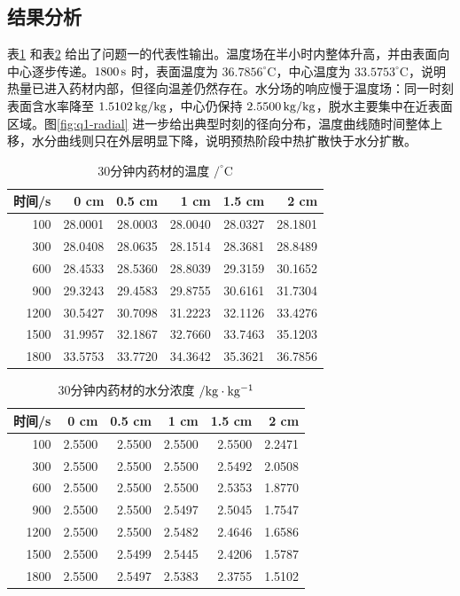 \documentclass[UTF8,a4paper,12pt]{ctexart}
\numberwithin{equation}{section}
\begin{document}
\subsection{结果分析}
表\ref{tab:q1-temp} 和表\ref{tab:q1-moist} 给出了问题一的代表性输出。温度场在半小时内整体升高，并由表面向中心逐步传递。$1800\rm\,s$ 时，表面温度为 $36.7856^\circ\mathrm C$，中心温度为 $33.5753^\circ\mathrm C$，说明热量已进入药材内部，但径向温差仍然存在。水分场的响应慢于温度场：同一时刻表面含水率降至 $1.5102\rm\,kg/kg$，中心仍保持 $2.5500\rm\,kg/kg$，脱水主要集中在近表面区域。图\ref{fig:q1-radial} 进一步给出典型时刻的径向分布，温度曲线随时间整体上移，水分曲线则只在外层明显下降，说明预热阶段中热扩散快于水分扩散。

\begin{table}[H]
  \centering
  \caption{30分钟内药材的温度 $/^\circ\mathrm C$}
  \label{tab:q1-temp}
  \begin{tabular}{rrrrrr}
    \toprule
    时间/s & 0 cm & 0.5 cm & 1 cm & 1.5 cm & 2 cm\\ \midrule
    100 & 28.0001 & 28.0003 & 28.0040 & 28.0327 & 28.1801\\
    300 & 28.0408 & 28.0635 & 28.1514 & 28.3681 & 28.8489\\
    600 & 28.4533 & 28.5360 & 28.8039 & 29.3159 & 30.1652\\
    900 & 29.3243 & 29.4583 & 29.8755 & 30.6161 & 31.7304\\
    1200 & 30.5427 & 30.7098 & 31.2223 & 32.1126 & 33.4276\\
    1500 & 31.9957 & 32.1867 & 32.7660 & 33.7463 & 35.1203\\
    1800 & 33.5753 & 33.7720 & 34.3642 & 35.3621 & 36.7856\\
    \bottomrule
  \end{tabular}
\end{table}

\begin{table}[H]
  \centering
  \caption{30分钟内药材的水分浓度 $/\rm kg\cdot kg^{-1}$}
  \label{tab:q1-moist}
  \begin{tabular}{rrrrrr}
    \toprule
    时间/s & 0 cm & 0.5 cm & 1 cm & 1.5 cm & 2 cm\\ \midrule
    100 & 2.5500 & 2.5500 & 2.5500 & 2.5500 & 2.2471\\
    300 & 2.5500 & 2.5500 & 2.5500 & 2.5492 & 2.0508\\
    600 & 2.5500 & 2.5500 & 2.5500 & 2.5353 & 1.8770\\
    900 & 2.5500 & 2.5500 & 2.5497 & 2.5045 & 1.7547\\
    1200 & 2.5500 & 2.5500 & 2.5482 & 2.4646 & 1.6586\\
    1500 & 2.5500 & 2.5499 & 2.5445 & 2.4206 & 1.5787\\
    1800 & 2.5500 & 2.5497 & 2.5383 & 2.3755 & 1.5102\\
    \bottomrule
  \end{tabular}
\end{table}
\end{document}
